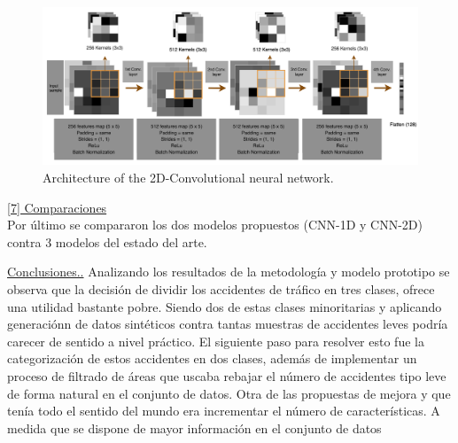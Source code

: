 \documentclass{uathesis-es}
\begin{document}
\begin{figure}[H]
	\centering
	\includegraphics[width=16cm]{Figures/1stPaper/TASPCNN.png}
	\caption{Architecture of the 2D-Convolutional neural network.}
	\label{TASPCNNIMAGE}
\end{figure}

\underline{[7] Comparaciones}\\
Por último se compararon los dos modelos propuestos (CNN-1D y CNN-2D) contra 3 modelos del estado del arte.


\underline{Conclusiones..}
Analizando los resultados de la metodología y modelo prototipo se observa que la decisión de dividir los accidentes de tráfico en tres clases, ofrece una utilidad bastante pobre. Siendo dos de estas clases minoritarias y aplicando generaciónn de datos sintéticos contra tantas muestras de accidentes leves podría carecer de sentido a nivel práctico.
El siguiente paso para resolver esto fue la categorización de estos accidentes en dos clases, además de implementar un proceso de filtrado de áreas que uscaba rebajar el número de accidentes tipo leve de forma natural en el conjunto de datos.
Otra de las propuestas de mejora y que tenía todo el sentido del mundo era incrementar el número de características. A medida que se dispone de mayor información en el conjunto de datos
\end{document}
